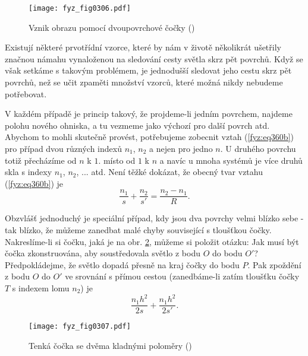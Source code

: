     \begin{figure}[ht!] %
      \centering
      \texttt{[image: fyz\_fig0306.pdf]}
      \caption{Vznik obrazu pomocí dvoupovrchové čočky
               (\cite[s.~355]{Feynman01})}
      \label{fyz:fig0306}
    \end{figure}
    
    Existují některé prvotřídní vzorce, které by nám v životě několikrát ušetřily značnou námahu 
    vynaloženou na sledování cesty světla skrz pět povrchů. Když se však setkáme s takovým 
    problémem, je jednodušší sledovat jeho cestu skrz pět povrchů, než se učit zpaměti množství 
    vzorců, které možná nikdy nebudeme potřebovat.
    
    V každém případě je princip takový, že projdeme-li jedním povrchem, najdeme polohu nového 
    ohniska, a tu vezmeme jako výchozí pro další povrch atd. Abychom to mohli skutečně provést, 
    potřebujeme zobecnit vztah (\ref{fyz:eq360b}) pro případ dvou různých indexů \(n_1\), \(n_2\) a 
    nejen pro jedno \(n\). U druhého povrchu totiž přecházíme od 	\(n\) k \(1\). místo od \(1\) k 
    \(n\) a navíc u mnoha systémů je více druhů skla s indexy \(n_1\), \(n_2\), ... atd. Není těžké 
    dokázat, že obecný tvar vztahu (\ref{fyz:eq360b}) je
    \begin{equation}  \label{fyz:eq364}
      \frac{n_1}{s} + \frac{n_2}{s'} = \frac{n_2-n_1}{R}.    
    \end{equation}
    
    Obzvlášť jednoduchý je speciální případ, kdy jsou dva povrchy velmi blízko sebe - tak blízko, 
    že můžeme zanedbat malé chyby související s tloušťkou čočky. Nakreslíme-li si čočku, jaká je na 
    obr. \ref{fyz:fig0307}, můžeme si položit otázku: Jak musí být čočka zkonstruována, aby 
    soustředovala světlo z bodu \(O\) do bodu \(O'\)? Předpokládejme, že světlo dopadá přesně na 
    kraj čočky do bodu \(P\). Pak zpoždění z bodu \(O\) do \(O'\) ve srovnání s přímou cestou 
    (zanedbáme-li zatím tloušťku čočky \(T\) s indexem lomu \(n_2\)) je
    \begin{equation}  \label{fyz:eq365}
      \frac{n_1h^2}{2s} + \frac{n_1h^2}{2s'}.
    \end{equation}
    
    \begin{figure}[ht!] %
       \centering
       \texttt{[image: fyz\_fig0307.pdf]}
       \caption{Tenká čočka se dvěma kladnými poloměry
               (\cite[s.~355]{Feynman01})}
       \label{fyz:fig0307}
    \end{figure}
    

